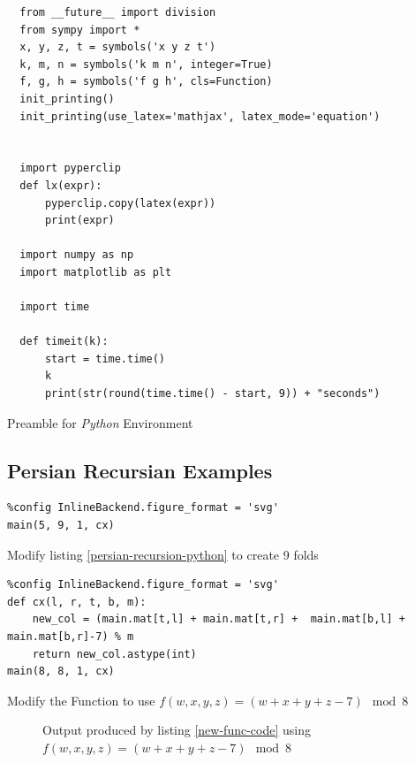 \documentclass[11pt]{article}
\begin{document}
\begin{listing}[htbp]
\begin{verbatim}
  from __future__ import division
  from sympy import *
  x, y, z, t = symbols('x y z t')
  k, m, n = symbols('k m n', integer=True)
  f, g, h = symbols('f g h', cls=Function)
  init_printing()
  init_printing(use_latex='mathjax', latex_mode='equation')


  import pyperclip
  def lx(expr):
      pyperclip.copy(latex(expr))
      print(expr)

  import numpy as np
  import matplotlib as plt

  import time

  def timeit(k):
      start = time.time()
      k
      print(str(round(time.time() - start, 9)) + "seconds")
\end{verbatim}
\caption{\label{py-env}Preamble for \emph{Python} Environment}
\end{listing}

\subsection{Persian Recursian Examples}
\label{persian-recursion-examples}
\begin{listing}[htbp]
\begin{verbatim}
%config InlineBackend.figure_format = 'svg'
main(5, 9, 1, cx)
\end{verbatim}
\caption{\label{8-fold-code}Modify listing \ref{persian-recursion-python} to create 9 folds}
\end{listing}



\begin{listing}[htbp]
\begin{verbatim}
%config InlineBackend.figure_format = 'svg'
def cx(l, r, t, b, m):
    new_col = (main.mat[t,l] + main.mat[t,r] +  main.mat[b,l] + main.mat[b,r]-7) % m
    return new_col.astype(int)
main(8, 8, 1, cx)
\end{verbatim}
\caption{\label{new-func-code}Modify the Function to use \(f(w,x,y,z) = (w + x + y + z - 7) \mod 8\)}
\end{listing}

\begin{figure}[htbp]
\centering

\caption{\label{new-func-plot}Output produced by listing \ref{new-func-code} using \(f(w,x,y,z) = (w + x + y + z - 7) \mod 8\)}
\end{figure}
\end{document}
